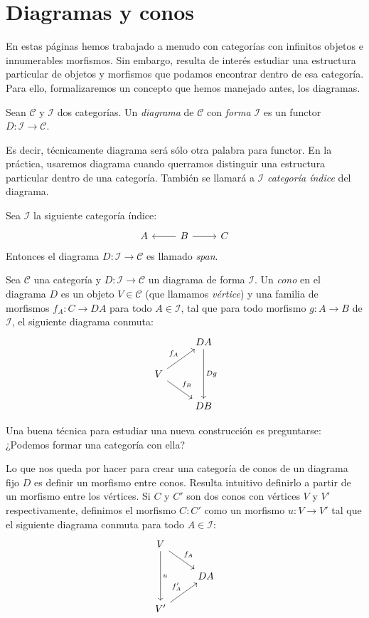 \documentclass[12pt, twoside]{book}
\newcommand{\newterm}[1]{\index{#1}\emph{#1}}
\newcommand{\cat}{{\mathcal{C}}}
\begin{document}
\section{Diagramas y conos}
En estas páginas hemos trabajado a menudo con categorías con infinitos objetos e innumerables morfismos.
Sin embargo, resulta de interés estudiar una estructura particular de objetos y morfismos que podamos encontrar dentro de esa categoría.
Para ello, formalizaremos un concepto que hemos manejado antes, los diagramas.
\begin{definition}
Sean $\cat$ y $\mathcal{I}$ dos categorías. Un \newterm{diagrama} de $\cat$ con \emph{forma} $\mathcal{I}$ es un functor $D \colon \mathcal{I} \to \cat$.
\end{definition}
Es decir, técnicamente diagrama será sólo otra palabra para functor.
En la práctica, usaremos diagrama cuando querramos distinguir una estructura particular dentro de una categoría.
También se llamará a $\mathcal{I}$ \emph{categoría índice} del diagrama.

\begin{example}\label{ejemplo-span}
Sea $\mathcal{I}$ la siguiente categoría índice:
\[ \begin{tikzcd}
A & B \arrow[l] \arrow[r] & C
\end{tikzcd} \]
Entonces el diagrama $D \colon \mathcal{I} \to \cat$ es llamado \newterm{span}.
\end{example}

\begin{definition}
Sea $\cat$ una categoría y $D \colon \mathcal{I} \to \cat$ un diagrama de forma $\mathcal{I}$.
Un \newterm{cono} en el diagrama $D$ es un objeto $V \in \cat$ (que llamamos \newterm{vértice}) y una familia de morfismos $f_A \colon C \to D A$ para todo $A \in \mathcal{I}$, tal que para todo morfismo $g \colon A \to B$ de $\mathcal{I}$, el siguiente diagrama conmuta:
\[ \begin{tikzcd}
 & D A \arrow[dd,"D g"]\\
V \arrow[ur,"f_A"] \arrow[dr,"f_B"]\\
 & D B
\end{tikzcd} \]
\end{definition}

Una buena técnica para estudiar una nueva construcción es preguntarse: ¿Podemos formar una categoría con ella?

Lo que nos queda por hacer para crear una categoría de conos de un diagrama fijo $D$ es definir un morfismo entre conos.
Resulta intuitivo definirlo a partir de un morfismo entre los vértices.
Si $C$ y $C'$ son dos conos con vértices $V$ y $V'$ respectivamente, definimos el morfismo $C \colon C'$ como un morfismo $u \colon V \to V'$ tal que el siguiente diagrama conmuta para todo $A \in \mathcal{I}$:
\[ \begin{tikzcd}
V \arrow[dr,"f_A"] \arrow[dd,"u"] &\\
 & D A\\
V' \arrow[ur,"f'_A"]
\end{tikzcd} \]
\end{document}
